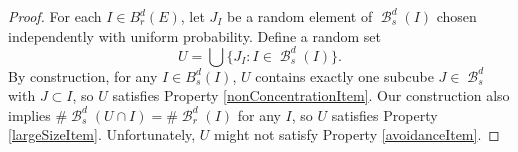 \documentclass[dvipsnames,letterpaper,12pt]{article}
\numberwithin{equation}{section}
\theoremstyle{plain}
\DeclareMathOperator{\B}{\mathcal{B}}
\begin{document}
\begin{proof}
	For each $I \in B_r^d(E)$, let $J_I$ be a random element of $\B^d_s(I)$ chosen independently with uniform probability. Define a random set
	\begin{equation} \label{Udefinition}
		U = \bigcup \{ J_I : I \in \B^d_s(I) \}.
	\end{equation}
	By construction, for any $I \in B^d_s(I)$, $U$ contains exactly one subcube $J \in \B_s^d$ with $J \subset I$, so $U$ satisfies Property \ref{nonConcentrationItem}. Our construction also implies $\# \B_s^d(U \cap I) = \# \B_r^d(I)$ for any $I$, 
	so $U$ satisfies Property \ref{largeSizeItem}. Unfortunately, $U$ might not satisfy Property \ref{avoidanceItem}. %


\end{proof}
\end{document}
